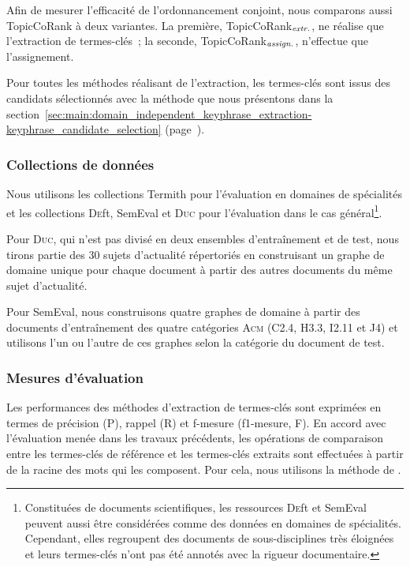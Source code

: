        Afin de mesurer l'efficacité de l'ordonnancement conjoint, nous
        comparons aussi TopicCoRank à deux variantes. La première,
        TopicCoRank$_\textnormal{\textit{extr.}}$, ne réalise que l'extraction
        de termes-clés~; la seconde,
        TopicCoRank$_\textnormal{\textit{assign.}}$, n'effectue que
        l'assignement.

        Pour toutes les méthodes réalisant de l'extraction, les termes-clés sont
        issus des candidats sélectionnés avec la méthode que nous présentons
        dans la
        section~\ref{sec:main:domain_independent_keyphrase_extraction-keyphrase_candidate_selection}
        (page~\pageref{sec:main:domain_independent_keyphrase_extraction-keyphrase_candidate_selection}).

      \subsubsection{Collections de données}
      \label{subsubsec:main-domain_specific_keyphrase_annotation-supervised_automatic_keyphrase_annotation-evaluation-evaluation_data}
        Nous utilisons les collections Termith pour l'évaluation en domaines de
        spécialités et les collections \textsc{De}ft, SemEval et \textsc{Duc}
        pour l'évaluation dans le cas général\footnote{Constituées de documents
        scientifiques, les ressources \textsc{De}ft et SemEval peuvent aussi
        être considérées comme des données en domaines de spécialités.
        Cependant, elles regroupent des documents de sous-disciplines très
        éloignées et leurs termes-clés n'ont pas été annotés avec la rigueur
        documentaire.}.
        
        Pour \textsc{Duc}, qui n'est pas divisé en deux ensembles d'entraînement
        et de test, nous tirons partie des 30 sujets d'actualité répertoriés en
        construisant un graphe \og{}de domaine\fg{} unique pour chaque document
        à partir des autres documents du même sujet d'actualité.
        
        Pour SemEval, nous construisons quatre graphes de domaine à partir des
        documents d'entraînement des quatre catégories \textsc{Acm} (C2.4, H3.3,
        I2.11 et J4) et utilisons l'un ou l'autre de ces graphes selon la
        catégorie du document de test. 
      
      \subsubsection{Mesures d'évaluation}
      \label{subsubsec:main-domain_specific_keyphrase_annotation-supervised_automatic_keyphrase_annotation-evaluation-evaluation_measures}
        Les performances des méthodes d'extraction de termes-clés sont exprimées
        en termes de précision (P), rappel (R) et f-mesure (f1-mesure, F). En
        accord avec l'évaluation menée dans les travaux précédents, les
        opérations de comparaison entre les termes-clés de référence et les
        termes-clés extraits sont effectuées à partir de la racine des mots qui
        les composent. Pour cela, nous utilisons la méthode de
        .

